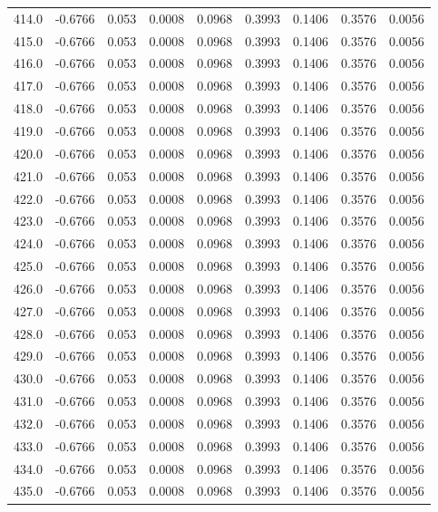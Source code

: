 \begin{longtable}{lrrrrrrrr}
414.0 & -0.6766 & 0.053 & 0.0008 & 0.0968 & 0.3993 & 0.1406 & 0.3576 & 0.0056 \\
415.0 & -0.6766 & 0.053 & 0.0008 & 0.0968 & 0.3993 & 0.1406 & 0.3576 & 0.0056 \\
416.0 & -0.6766 & 0.053 & 0.0008 & 0.0968 & 0.3993 & 0.1406 & 0.3576 & 0.0056 \\
417.0 & -0.6766 & 0.053 & 0.0008 & 0.0968 & 0.3993 & 0.1406 & 0.3576 & 0.0056 \\
418.0 & -0.6766 & 0.053 & 0.0008 & 0.0968 & 0.3993 & 0.1406 & 0.3576 & 0.0056 \\
419.0 & -0.6766 & 0.053 & 0.0008 & 0.0968 & 0.3993 & 0.1406 & 0.3576 & 0.0056 \\
420.0 & -0.6766 & 0.053 & 0.0008 & 0.0968 & 0.3993 & 0.1406 & 0.3576 & 0.0056 \\
421.0 & -0.6766 & 0.053 & 0.0008 & 0.0968 & 0.3993 & 0.1406 & 0.3576 & 0.0056 \\
422.0 & -0.6766 & 0.053 & 0.0008 & 0.0968 & 0.3993 & 0.1406 & 0.3576 & 0.0056 \\
423.0 & -0.6766 & 0.053 & 0.0008 & 0.0968 & 0.3993 & 0.1406 & 0.3576 & 0.0056 \\
424.0 & -0.6766 & 0.053 & 0.0008 & 0.0968 & 0.3993 & 0.1406 & 0.3576 & 0.0056 \\
425.0 & -0.6766 & 0.053 & 0.0008 & 0.0968 & 0.3993 & 0.1406 & 0.3576 & 0.0056 \\
426.0 & -0.6766 & 0.053 & 0.0008 & 0.0968 & 0.3993 & 0.1406 & 0.3576 & 0.0056 \\
427.0 & -0.6766 & 0.053 & 0.0008 & 0.0968 & 0.3993 & 0.1406 & 0.3576 & 0.0056 \\
428.0 & -0.6766 & 0.053 & 0.0008 & 0.0968 & 0.3993 & 0.1406 & 0.3576 & 0.0056 \\
429.0 & -0.6766 & 0.053 & 0.0008 & 0.0968 & 0.3993 & 0.1406 & 0.3576 & 0.0056 \\
430.0 & -0.6766 & 0.053 & 0.0008 & 0.0968 & 0.3993 & 0.1406 & 0.3576 & 0.0056 \\
431.0 & -0.6766 & 0.053 & 0.0008 & 0.0968 & 0.3993 & 0.1406 & 0.3576 & 0.0056 \\
432.0 & -0.6766 & 0.053 & 0.0008 & 0.0968 & 0.3993 & 0.1406 & 0.3576 & 0.0056 \\
433.0 & -0.6766 & 0.053 & 0.0008 & 0.0968 & 0.3993 & 0.1406 & 0.3576 & 0.0056 \\
434.0 & -0.6766 & 0.053 & 0.0008 & 0.0968 & 0.3993 & 0.1406 & 0.3576 & 0.0056 \\
435.0 & -0.6766 & 0.053 & 0.0008 & 0.0968 & 0.3993 & 0.1406 & 0.3576 & 0.0056 \\

\end{longtable}
